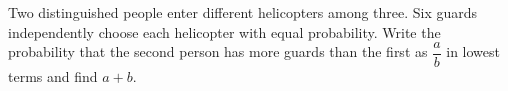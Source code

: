 Two distinguished people enter different helicopters among three. Six guards independently choose each helicopter with equal probability. Write the probability that the second person has more guards than the first as $\dfrac{a}{b}$ in lowest terms and find $a+b$.
